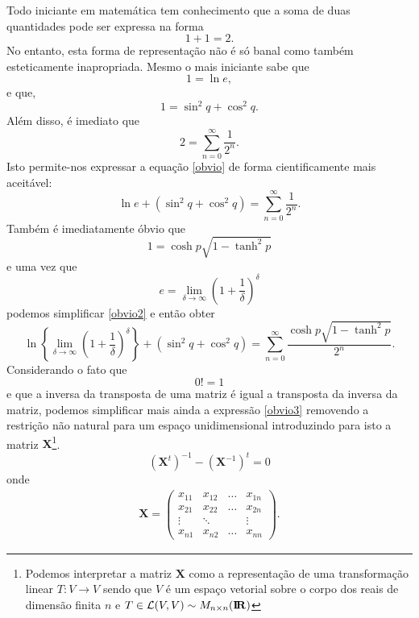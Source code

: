 Todo iniciante em matemática tem conhecimento que a soma de duas quantidades pode ser expressa na forma
\begin{equation}
1+1=2.
\label{obvio}
\end{equation}
No entanto, esta forma de representação não é só banal como também esteticamente inapropriada. Mesmo o mais iniciante sabe que
\[ 1 = \ln e, \]
e que,
\[ 1 = \sin^{2} q + \cos^{2} q. \]
Além disso, é imediato que
\[ 2 = \sum_{n=0}^{\infty} \frac{1}{2^{n}}. \]
Isto permite-nos expressar a equação \ref{obvio} de forma cientificamente mais aceitável:
\begin{equation}
\ln e + ( \sin^{2} q + \cos^{2} q ) = \sum_{n=0}^{\infty} \frac{1}{2^{n}}.
\label{obvio2}
\end{equation}
Também é imediatamente óbvio que
\[ 1 = \cosh p \sqrt{1-\tanh^{2} p} \]
e uma vez que
\[ e = \lim_{\delta \rightarrow \infty} \left( 1+\frac{1}{\delta}
\right)^{\delta} \]
podemos simplificar \ref{obvio2} e então obter
\begin{equation}
\ln \left\{\lim_{\delta \rightarrow \infty} \left( 1+\frac{1}{\delta}
\right)^{\delta} \right\} + ( \sin^{2} q + \cos^{2} q ) = \sum_{n=0}^{\infty}
\frac{\cosh p \sqrt{1-\tanh^{2} p}}{2^{n}}.
\label{obvio3}
\end{equation}
Considerando o fato que
\begin{equation}
0! = 1
\label{obvio4}
\end{equation}
e que a inversa da transposta de uma matriz é igual a transposta da inversa da matriz, podemos simplificar mais ainda a expressão \ref{obvio3} removendo a restrição não natural para um espaço unidimensional introduzindo para isto a matriz $\mathbf{X}$\footnote{Podemos interpretar a matriz $\mathbf{X}$ como a representação de uma transformação linear $T :V \rightarrow V$ sendo que $V$ é um espaço vetorial sobre o corpo dos reais de dimensão finita $n$ e $T \in {\cal L}(V,V) \sim M_{n \times n}({\mathbf{I\!R}})$}.
\begin{equation}
(\mathbf{X}^{t})^{-1} - (\mathbf{X}^{-1})^{t} = 0
\label{vetor}
\end{equation}
onde
\begin{eqnarray*}
\mathbf{X} = \left( \begin{array}{cccc}
                       x_{11} & x_{12} & \ldots & x_{1n} \\
                       x_{21} & x_{22} & \ldots & x_{2n} \\
                       \vdots & \ddots & & \vdots \\
                       x_{n1} & x_{n2} & \ldots & x_{nn}
                     \end{array}
             \right).
\end{eqnarray*}
